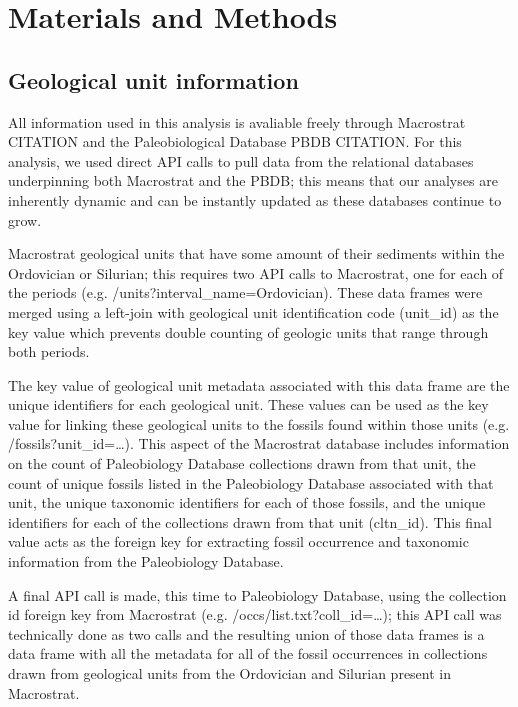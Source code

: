 \documentclass[12pt,letterpaper]{article}
\begin{document}
\section{Materials and Methods}

\subsection{Geological unit information}

All information used in this analysis is avaliable freely through Macrostrat CITATION and the Paleobiological Database PBDB CITATION. For this analysis, we used direct API calls to pull data from the relational databases underpinning both Macrostrat and the PBDB; this means that our analyses are inherently dynamic and can be instantly updated as these databases continue to grow.

Macrostrat geological units that have some amount of their sediments within the Ordovician or Silurian; this requires two API calls to Macrostrat, one for each of the periods (e.g. /units?interval_name=Ordovician). These data frames were merged using a left-join with geological unit identification code (unit\_id) as the key value which prevents double counting of geologic units that range through both periods. 

The key value of geological unit metadata associated with this data frame are the unique identifiers for each geological unit. These values can be used as the key value for linking these geological units to the fossils found within those units (e.g. /fossils?unit\_id=\dots). This aspect of the Macrostrat database includes information on the count of Paleobiology Database collections drawn from that unit, the count of unique fossils listed in the Paleobiology Database associated with that unit, the unique taxonomic identifiers for each of those fossils, and the unique identifiers for each of the collections drawn from that unit (cltn\_id). This final value acts as the foreign key for extracting fossil occurrence and taxonomic information from the Paleobiology Database.

A final API call is made, this time to Paleobiology Database, using the collection id foreign key from Macrostrat (e.g. /occs/list.txt?coll\_id=\dots); this API call was technically done as two calls and the resulting union of those data frames is a data frame with all the metadata for all of the fossil occurrences in collections drawn from geological units from the Ordovician and Silurian present in Macrostrat.
\end{document}
